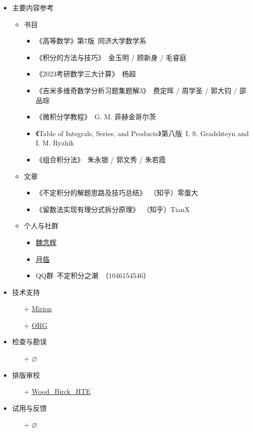 \documentclass{ctexbook}
\begin{document}
\begin{itemize}
	\item 主要内容参考
	\begin{itemize}
		\item 书目
		\begin{itemize}
			\item 《高等数学》第7版\ 同济大学数学系
			\item 《积分的方法与技巧》\ 金玉明 / 顾新身 / 毛睿庭
			\item 《2023考研数学三大计算》\ 杨超
			\item 《吉米多维奇数学分析习题集题解3》\ 费定晖 / 周学圣 / 郭大钧 / 邵品琮
			\item 《微积分学教程》\ {\selectfont G. M. }菲赫金哥尔茨
			\item 《Table of Integrals, Series, and Products》第八版\ I. S. Gradshteyn and I. M. Ryzhik
			\item 《组合积分法》\ 朱永银 / 郭文秀 / 朱若霞
		\end{itemize}
		\item 文章
		\begin{itemize}
			\item 《不定积分的解题思路及技巧总结》\ （知乎）零蛋大
			\item 《留数法实现有理分式拆分原理》\ （知乎）TianX
		\end{itemize}
		\item 个人与社群
		\begin{itemize}
			\item \underline{魏念辉}
			\item \underline{月临}
			\item QQ群\ 不定积分之潮\ （1046154546）
		\end{itemize}
	\end{itemize}
	\item 技术支持
	\begin{itemize}
		\item[+] \underline{Mirion}
		\item[+] \underline{ORG}
	\end{itemize}
	\item 检查与勘误
	\begin{itemize}
		\item[+] $\varnothing$
	\end{itemize}
	\item 排版审校
	\begin{itemize}
		\item[+] \underline{Wood\_Birck\_HTE}
	\end{itemize}
	\item 试用与反馈
	\begin{itemize}
		\item[+] $\varnothing$
	\end{itemize}
\end{itemize}
\end{document}

